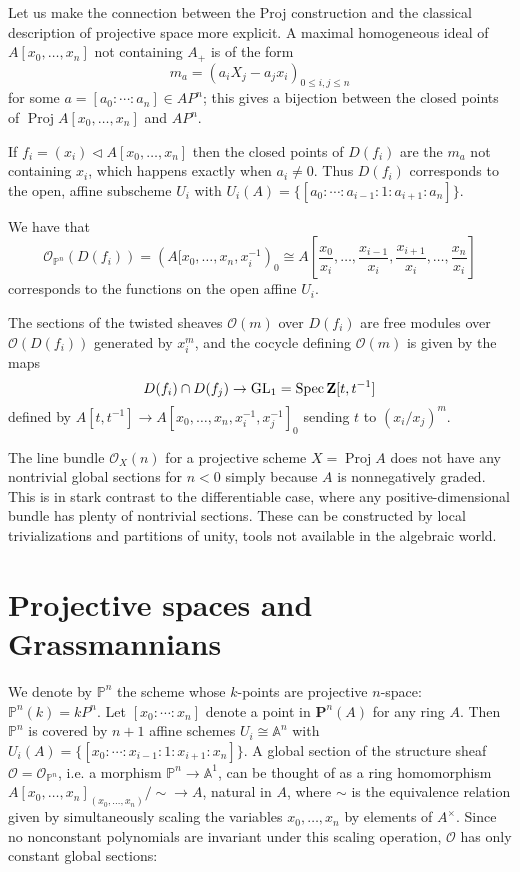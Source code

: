 \documentclass[a4paper,openany]{scrbook}
\DeclareMathOperator{\Proj}{Proj}
\newcommand{\Reg}[1]{\mathcal O_{#1}}
\begin{document}
Let us make the connection between the Proj construction and the classical description of projective space more explicit. A maximal homogeneous ideal of $A[x_0,\dots,x_n]$ not containing $A_+$ is of the form
\[
m_a = (a_i X_j - a_j x_i)_{0 \leq i,j \leq n}
\]
for some $a=[a_0:\cdots:a_n] \in AP^n$; this gives a bijection between the closed points of $\Proj A[x_0,\dots,x_n]$ and $AP^n$.

If $f_i=(x_i) \triangleleft A[x_0,\dots,x_n]$ then the closed points of $D(f_i)$ are the $m_a$ not containing $x_i$, which happens exactly when $a_i \neq 0$. Thus $D(f_i)$ corresponds to the open, affine subscheme $U_i$ with $U_i(A)= \{[a_0:\cdots:a_{i-1}:1:a_{i+1}:a_n]\}$.

We have that
\[
\Reg{\mathbb P^n}(D(f_i)) = (A[x_0,\dots,x_n,x_i^{-1})_0 \cong A[\frac {x_0}{x_i},\dots,\frac {x_{i-1}}{x_i},\frac {x_{i+1}}{x_i},\dots,\frac{x_n}{x_i}]
\]
corresponds to the functions on the open affine $U_i$.

The sections of the twisted sheaves $\mathcal O(m)$ over $D(f_i)$ are free modules over $\mathcal O(D(f_i))$ generated by $x_i^m$, and the cocycle defining $\mathcal O(m)$ is given by the maps
\[
D(f_i) \cap D(f_j) \to \operatorname{GL}_1 = \operatorname{Spec} \mathbf Z[t,t^{-1}]
\]
defined by $A[t,t^{-1}] \to A[x_0,\dots,x_n,x_i^{-1},x_j^{-1}]_0$ sending $t$ to $(x_i/x_j)^m$.

\begin{remark}
The line bundle $\Reg{X}(n)$ for a projective scheme $X=\Proj A$ does not have any nontrivial global sections for $n<0$ simply because $A$ is nonnegatively graded. This is in stark contrast to the differentiable case, where any positive-dimensional bundle has plenty of nontrivial sections. These can be constructed by local trivializations and partitions of unity, tools not available in the algebraic world.
\end{remark}

\section{Projective spaces and Grassmannians}

We denote by $\mathbb P^n$ the scheme whose $k$-points are projective $n$-space: $\mathbb P^n(k) = kP^n$. Let $[x_0:\cdots:x_n]$ denote a point in $\mathbf P^n(A)$ for any ring $A$. Then $\mathbb P^n$ is covered by $n+1$ affine schemes $U_i \cong \mathbb A^n$ with $U_i(A)=\{[x_0:\cdots:x_{i-1}:1:x_{i+1}:x_n]\}$. A global section of the structure sheaf $\mathcal O=\Reg{\mathbb P^n}$, i.e. a morphism $\mathbb P^n \to \mathbb A^1$, can be thought of as a ring homomorphism $A[x_0,\dots,x_n]_{(x_0,\dots,x_n)}/\sim \to A$, natural in $A$, where $\sim$ is the equivalence relation given by simultaneously scaling the variables $x_0,\dots,x_n$ by elements of $A^\times$. Since no nonconstant polynomials are invariant under this scaling operation, $\mathcal O$ has only constant global sections: 
\end{document}
